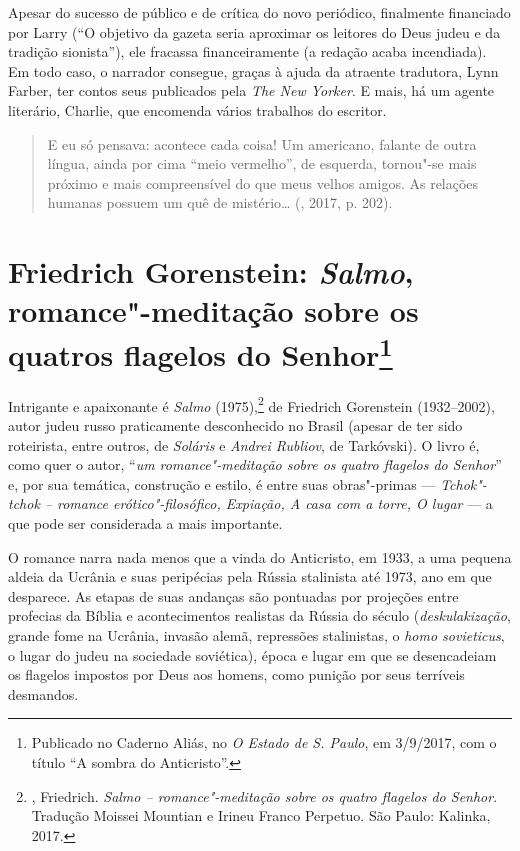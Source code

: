 Apesar do sucesso de público e de crítica do novo periódico,
finalmente financiado por Larry (``O objetivo da gazeta seria
aproximar os leitores do Deus judeu e da tradição sionista''), ele
fracassa financeiramente (a redação acaba incendiada).
Em todo caso, o narrador consegue, graças à ajuda da atraente
tradutora, Lynn Farber, ter contos seus publicados pela
\emph{The New Yorker}. E mais, há um agente literário,
Charlie, que encomenda vários trabalhos do escritor.

\begin{quotation}
E eu só pensava: acontece cada coisa! Um americano, falante de outra língua, ainda por cima ``meio vermelho'', de esquerda, tornou"-se mais próximo e mais compreensível do que meus velhos amigos. As relações humanas possuem um quê de mistério\ldots{} (, 2017, p. 202).

\end{quotation}

\chapter*{Friedrich Gorenstein: \emph{Salmo}, romance"-meditação sobre os quatros flagelos do Senhor\footnote{Publicado no Caderno Aliás, no \emph{O Estado de S. Paulo}, em 3/9/2017, com o título ``A sombra do Anticristo''.}}


Intrigante e apaixonante é \emph{Salmo} (1975),\footnote{, Friedrich. 
\emph{Salmo -- romance"-meditação sobre os quatro flagelos do Senhor}. 
Tradução Moissei Mountian e Irineu Franco Perpetuo. São Paulo: Kalinka,
 2017.} de Friedrich Gorenstein (1932--2002), autor judeu russo
praticamente desconhecido no Brasil (apesar de ter sido roteirista, entre outros, de \emph{Soláris}
e \emph{Andrei Rubliov}, de Tarkóvski). O livro é, como quer o autor,
``\emph{um romance"-meditação sobre os quatro flagelos do Senhor}'' e,
por sua temática, construção e estilo, é entre suas obras"-primas
--- \emph{Tchok"-tchok -- romance erótico"-filosófico, Expiação, A casa com a
torre, O lugar} --- a que pode ser considerada a mais importante.

O romance narra nada menos que a vinda do Anticristo, em 1933, a uma
pequena aldeia da Ucrânia e suas peripécias pela Rússia stalinista até
1973, ano em que desparece. As etapas de suas andanças são pontuadas por
projeções entre profecias da Bíblia e acontecimentos realistas da Rússia
do século  (\emph{deskulakização}, grande fome na Ucrânia, invasão alemã,
repressões stalinistas, o \emph{homo sovieticus}, o lugar do judeu na
sociedade soviética), época e lugar em que se desencadeiam os flagelos
impostos por Deus aos homens, como punição por seus terríveis desmandos.

